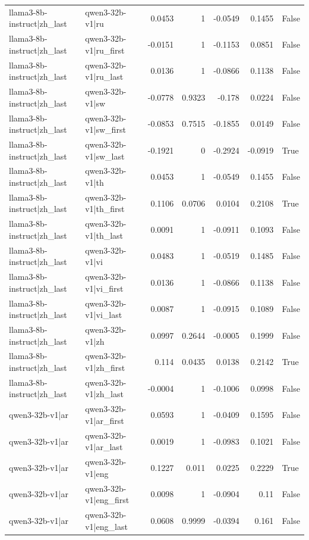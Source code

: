 \begin{table}
\begin{tabular}{l l r r r r l}
llama3-8b-instruct|zh_last & qwen3-32b-v1|ru & 0.0453 & 1 & -0.0549 & 0.1455 & False \\
llama3-8b-instruct|zh_last & qwen3-32b-v1|ru_first & -0.0151 & 1 & -0.1153 & 0.0851 & False \\
llama3-8b-instruct|zh_last & qwen3-32b-v1|ru_last & 0.0136 & 1 & -0.0866 & 0.1138 & False \\
llama3-8b-instruct|zh_last & qwen3-32b-v1|sw & -0.0778 & 0.9323 & -0.178 & 0.0224 & False \\
llama3-8b-instruct|zh_last & qwen3-32b-v1|sw_first & -0.0853 & 0.7515 & -0.1855 & 0.0149 & False \\
llama3-8b-instruct|zh_last & qwen3-32b-v1|sw_last & -0.1921 & 0 & -0.2924 & -0.0919 & True \\
llama3-8b-instruct|zh_last & qwen3-32b-v1|th & 0.0453 & 1 & -0.0549 & 0.1455 & False \\
llama3-8b-instruct|zh_last & qwen3-32b-v1|th_first & 0.1106 & 0.0706 & 0.0104 & 0.2108 & True \\
llama3-8b-instruct|zh_last & qwen3-32b-v1|th_last & 0.0091 & 1 & -0.0911 & 0.1093 & False \\
llama3-8b-instruct|zh_last & qwen3-32b-v1|vi & 0.0483 & 1 & -0.0519 & 0.1485 & False \\
llama3-8b-instruct|zh_last & qwen3-32b-v1|vi_first & 0.0136 & 1 & -0.0866 & 0.1138 & False \\
llama3-8b-instruct|zh_last & qwen3-32b-v1|vi_last & 0.0087 & 1 & -0.0915 & 0.1089 & False \\
llama3-8b-instruct|zh_last & qwen3-32b-v1|zh & 0.0997 & 0.2644 & -0.0005 & 0.1999 & False \\
llama3-8b-instruct|zh_last & qwen3-32b-v1|zh_first & 0.114 & 0.0435 & 0.0138 & 0.2142 & True \\
llama3-8b-instruct|zh_last & qwen3-32b-v1|zh_last & -0.0004 & 1 & -0.1006 & 0.0998 & False \\
qwen3-32b-v1|ar & qwen3-32b-v1|ar_first & 0.0593 & 1 & -0.0409 & 0.1595 & False \\
qwen3-32b-v1|ar & qwen3-32b-v1|ar_last & 0.0019 & 1 & -0.0983 & 0.1021 & False \\
qwen3-32b-v1|ar & qwen3-32b-v1|eng & 0.1227 & 0.011 & 0.0225 & 0.2229 & True \\
qwen3-32b-v1|ar & qwen3-32b-v1|eng_first & 0.0098 & 1 & -0.0904 & 0.11 & False \\
qwen3-32b-v1|ar & qwen3-32b-v1|eng_last & 0.0608 & 0.9999 & -0.0394 & 0.161 & False \\

\end{tabular}
\end{table}
